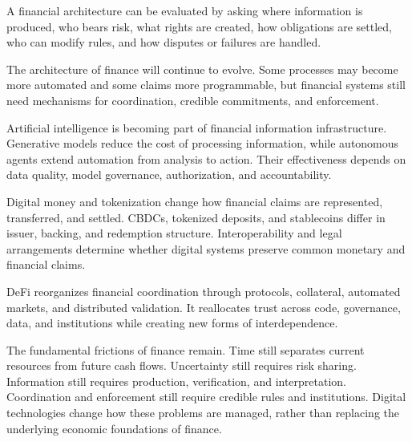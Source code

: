 \begin{tcolorbox}[
enhanced,
breakable,
colback=white,
colframe=FinanceBlue,
boxrule=0.7pt,
sharp corners,
borderline west={2.2pt}{0pt}{FinanceBlue},
title=\textbf{Financial Perspective: Technology Reallocates Trust and Enforcement},
coltitle=white,
colbacktitle=FinanceBlue,
fonttitle=\bfseries,
before skip=1.2em,
after skip=1.2em
]

A financial architecture can be evaluated by asking where information is produced, who bears risk, what rights are created, how obligations are settled, who can modify rules, and how disputes or failures are handled.

\end{tcolorbox}

The architecture of finance will continue to evolve. Some processes may become more automated and some claims more programmable, but financial systems still need mechanisms for coordination, credible commitments, and enforcement.




Artificial intelligence is becoming part of financial information infrastructure. Generative models reduce the cost of processing information, while autonomous agents extend automation from analysis to action. Their effectiveness depends on data quality, model governance, authorization, and accountability.

Digital money and tokenization change how financial claims are represented, transferred, and settled. CBDCs, tokenized deposits, and stablecoins differ in issuer, backing, and redemption structure. Interoperability and legal arrangements determine whether digital systems preserve common monetary and financial claims.

DeFi reorganizes financial coordination through protocols, collateral, automated markets, and distributed validation. It reallocates trust across code, governance, data, and institutions while creating new forms of interdependence.

The fundamental frictions of finance remain. Time still separates current resources from future cash flows. Uncertainty still requires risk sharing. Information still requires production, verification, and interpretation. Coordination and enforcement still require credible rules and institutions. Digital technologies change how these problems are managed, rather than replacing the underlying economic foundations of finance.



